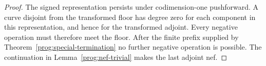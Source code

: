 \begin{proof}
The signed representation persists under codimension-one
pushforward.  A curve disjoint from the transformed floor
has degree zero for each component in this representation,
and hence for the transformed adjoint.  Every negative
operation must therefore meet the floor.  After the finite
prefix supplied by Theorem~\ref{prog:special-termination}
no further negative operation is possible.  The
continuation in Lemma~\ref{prog:nef-trivial} makes the
last adjoint nef.
\end{proof}




